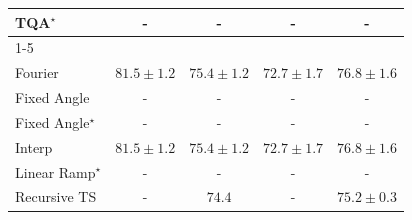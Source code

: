 \begin{tabular}{l|cccc|}
TQA$^\star$ & {\cellcolor[HTML]{000000}} \color[HTML]{F1F1F1} {\cellcolor{white}} \color{black} - & {\cellcolor[HTML]{000000}} \color[HTML]{F1F1F1} {\cellcolor{white}} \color{black} - & {\cellcolor[HTML]{000000}} \color[HTML]{F1F1F1} {\cellcolor{white}} \color{black} - & {\cellcolor[HTML]{000000}} \color[HTML]{F1F1F1} {\cellcolor{white}} \color{black} - \\
\cline{1-5}
\multicolumn{5}{c}{\rule{0pt}{8pt}PP} \\
\midrule
Fourier & {\cellcolor[HTML]{00512E}} \color[HTML]{F1F1F1} $81.5\pm 1.2$ & {\cellcolor[HTML]{A2D88A}} \color[HTML]{000000} $75.4\pm 1.2$ & {\cellcolor[HTML]{F0F9B4}} \color[HTML]{000000} $72.7\pm 1.7$ & {\cellcolor[HTML]{6DC073}} \color[HTML]{000000} $76.8\pm 1.6$ \\
Fixed Angle & {\cellcolor[HTML]{000000}} \color[HTML]{F1F1F1} {\cellcolor{white}} \color{black} - & {\cellcolor[HTML]{000000}} \color[HTML]{F1F1F1} {\cellcolor{white}} \color{black} - & {\cellcolor[HTML]{000000}} \color[HTML]{F1F1F1} {\cellcolor{white}} \color{black} - & {\cellcolor[HTML]{000000}} \color[HTML]{F1F1F1} {\cellcolor{white}} \color{black} - \\
Fixed Angle$^\star$ & {\cellcolor[HTML]{000000}} \color[HTML]{F1F1F1} {\cellcolor{white}} \color{black} - & {\cellcolor[HTML]{000000}} \color[HTML]{F1F1F1} {\cellcolor{white}} \color{black} - & {\cellcolor[HTML]{000000}} \color[HTML]{F1F1F1} {\cellcolor{white}} \color{black} - & {\cellcolor[HTML]{000000}} \color[HTML]{F1F1F1} {\cellcolor{white}} \color{black} - \\
Interp & {\cellcolor[HTML]{00512E}} \color[HTML]{F1F1F1} $81.5\pm 1.2$ & {\cellcolor[HTML]{A2D88A}} \color[HTML]{000000} $75.4\pm 1.2$ & {\cellcolor[HTML]{F0F9B4}} \color[HTML]{000000} $72.7\pm 1.7$ & {\cellcolor[HTML]{6DC073}} \color[HTML]{000000} $76.8\pm 1.6$ \\
Linear Ramp$^\star$ & {\cellcolor[HTML]{000000}} \color[HTML]{F1F1F1} {\cellcolor{white}} \color{black} - & {\cellcolor[HTML]{000000}} \color[HTML]{F1F1F1} {\cellcolor{white}} \color{black} - & {\cellcolor[HTML]{000000}} \color[HTML]{F1F1F1} {\cellcolor{white}} \color{black} - & {\cellcolor[HTML]{000000}} \color[HTML]{F1F1F1} {\cellcolor{white}} \color{black} - \\
Recursive TS & {\cellcolor[HTML]{000000}} \color[HTML]{F1F1F1} {\cellcolor{white}} \color{black} - & {\cellcolor[HTML]{C4E799}} \color[HTML]{000000} $74.4$ & {\cellcolor[HTML]{000000}} \color[HTML]{F1F1F1} {\cellcolor{white}} \color{black} - & {\cellcolor[HTML]{ABDC8D}} \color[HTML]{000000} $75.2\pm 0.3$ \\

\end{tabular}
